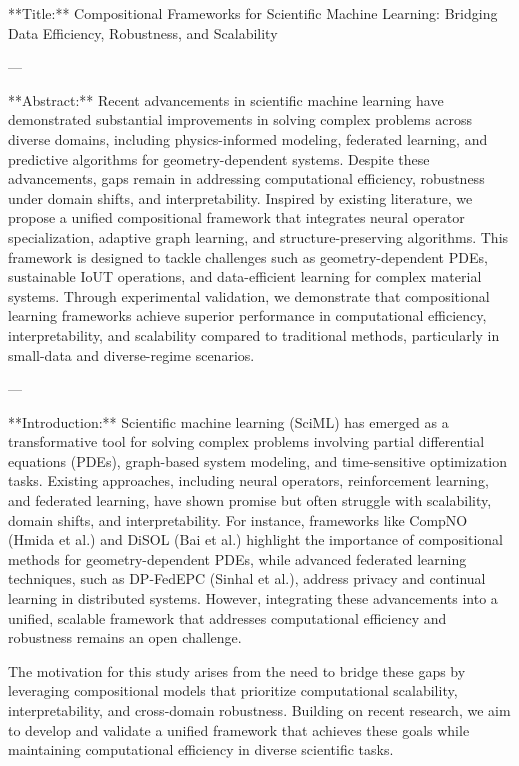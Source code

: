 **Title:** Compositional Frameworks for Scientific Machine Learning: Bridging Data Efficiency, Robustness, and Scalability  

---

**Abstract:**  
Recent advancements in scientific machine learning have demonstrated substantial improvements in solving complex problems across diverse domains, including physics-informed modeling, federated learning, and predictive algorithms for geometry-dependent systems. Despite these advancements, gaps remain in addressing computational efficiency, robustness under domain shifts, and interpretability. Inspired by existing literature, we propose a unified compositional framework that integrates neural operator specialization, adaptive graph learning, and structure-preserving algorithms. This framework is designed to tackle challenges such as geometry-dependent PDEs, sustainable IoUT operations, and data-efficient learning for complex material systems. Through experimental validation, we demonstrate that compositional learning frameworks achieve superior performance in computational efficiency, interpretability, and scalability compared to traditional methods, particularly in small-data and diverse-regime scenarios.  

---

**Introduction:**  
Scientific machine learning (SciML) has emerged as a transformative tool for solving complex problems involving partial differential equations (PDEs), graph-based system modeling, and time-sensitive optimization tasks. Existing approaches, including neural operators, reinforcement learning, and federated learning, have shown promise but often struggle with scalability, domain shifts, and interpretability. For instance, frameworks like CompNO (Hmida et al.) and DiSOL (Bai et al.) highlight the importance of compositional methods for geometry-dependent PDEs, while advanced federated learning techniques, such as DP-FedEPC (Sinhal et al.), address privacy and continual learning in distributed systems. However, integrating these advancements into a unified, scalable framework that addresses computational efficiency and robustness remains an open challenge.  

The motivation for this study arises from the need to bridge these gaps by leveraging compositional models that prioritize computational scalability, interpretability, and cross-domain robustness. Building on recent research, we aim to develop and validate a unified framework that achieves these goals while maintaining computational efficiency in diverse scientific tasks.  

